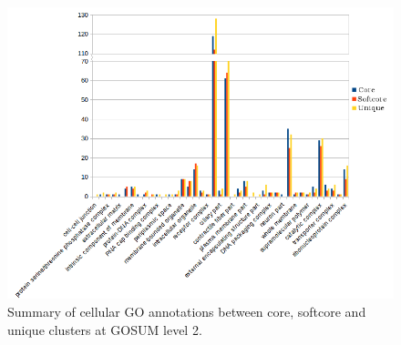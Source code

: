 \documentclass[12pt]{article}
\begin{document}
\begin{figure} 
\includegraphics[scale=.8]{3Aug18_cluster-investigation/figures/gosum-pan/Pan-gosum2-cell-split.png} 
\caption{Summary of cellular GO annotations between core, softcore and unique clusters at GOSUM level 2.} 
\label{fig:PanGo2Cell}
\end{figure} 
\FloatBarrier
\end{document}
